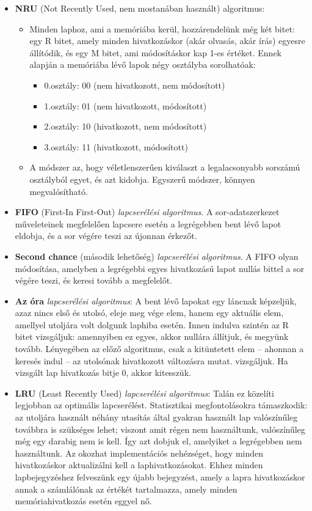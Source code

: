 \documentclass[tikz,12pt,margin=0px]{article}
\begin{document}
\begin{itemize}[topsep=8pt,itemsep=4pt,partopsep=4pt, parsep=4pt]
        \item \textbf{NRU} (Not Recently Used, nem mostanában használt) algoritmus:
        \begin{itemize}
            \item Minden laphoz, ami a memóriába kerül, hozzárendelünk még két bitet: egy R bitet, amely minden hivatkozáskor (akár olvasás, akár írás) egyesre állítódik, és egy M bitet, ami módosításkor kap 1-es értéket. Ennek alapján a memóriába lévő lapok négy osztályba sorolhatóak:
			\begin{itemize}
				\item 0.osztály: 00 (nem hivatkozott, nem módosított)
				\item 1.osztály: 01 (nem hivatkozott, módosított)
				\item 2.osztály: 10 (hivatkozott, nem módosított)
				\item 3.osztály: 11 (hivatkozott, módosított)
			\end{itemize}
			\item A módszer az, hogy véletlenszerűen kiválaszt a legalacsonyabb sorszámú osztályból egyet, és azt kidobja. Egyszerű módszer, könnyen megvalósítható.
		\end{itemize}
        \item \textbf{FIFO} (First-In First-Out) \emph{lapcserélési algoritmus}. A sor-adatszerkezet műveleteinek megfelelően lapcsere esetén a legrégebben bent lévő lapot eldobja, és a sor végére teszi az újonnan érkezőt.
        \item \textbf{Second chance} (második lehetőség) \emph{lapcserélési algoritmus}. A FIFO olyan módosítása, amelyben a legrégebbi egyes hivatkozású lapot nullás bittel a sor végére teszi, és keresi tovább a megfelelőt.
        \item \textbf{Az óra} \emph{lapcserélési algoritmus}: A bent lévő lapokat egy láncnak képzeljük, azaz nincs első és utolsó, eleje meg vége elem, hanem egy aktuális elem, amellyel utoljára volt dolgunk laphiba esetén. Innen indulva szintén az R bitet vizsgáljuk: amennyiben ez egyes, akkor nullára állítjuk, és megyünk tovább. Lényegében az előző algoritmus, csak a kitüntetett elem – ahonnan a keresés indul – az utolsónak hivatkozott változásra mutat.
		vizsgáljuk. Ha vizsgált lap hivatkozás bitje 0, akkor kitesszük.
        \item \textbf{LRU} (Least Recently Used) \emph{lapcserélési algoritmus}: Talán ez közelíti legjobban az optimális lapcserélést. Statisztikai megfontolásokra támaszkodik: az utoljára használt néhány utasítás által gyakran használt lap valószínűleg továbbra is szükséges lehet; viszont amit régen nem használtunk, valószínűleg még egy darabig nem is kell. Így azt dobjuk el, amelyiket a legrégebben nem használtunk. Az okozhat implementációs nehézséget, hogy minden hivatkozáskor aktualizálni kell a laphivatkozásokat. Ehhez minden lapbejegyzéshez felveszünk egy újabb bejegyzést, amely a lapra hivatkozáskor annak a számlálónak az értékét tartalmazza, amely minden memóriahivatkozás esetén eggyel nő.

\end{itemize}
\end{document}
